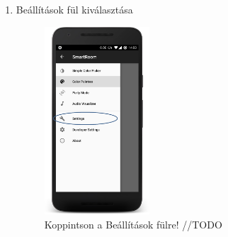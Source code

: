 \documentclass[../main.tex]{subfiles}
\begin{document}
\begin{enumerate}
                \item Beállítások fül kiválasztása
                     \begin{figure}[!h]
                        \includegraphics[height=7cm]{android_res/screen_pictures/tap_settings_menu}
                        \caption{Koppintson a Beállítások fülre! //TODO}
                    \end{figure}
                    

\end{enumerate}
\end{document}
